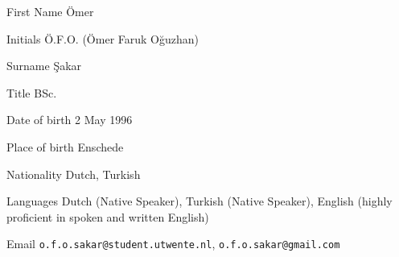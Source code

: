 

\begin{cvskills}


  \cvskill
{First Name} %
{\"Omer} %

  \cvskill
{Initials} %
{\"O.F.O. (\"Omer Faruk O\u{g}uzhan)} %

  \cvskill
{Surname} %
{\c{S}akar} %

  \cvskill
{Title} %
{BSc.} %

  \cvskill
{Date of birth} %
{2 May 1996} %

  \cvskill
{Place of birth} %
{Enschede} %

  \cvskill
{Nationality} %
{Dutch, Turkish} %

  \cvskill
{Languages} %
{Dutch (Native Speaker), Turkish (Native Speaker), English (highly proficient in spoken and written English)} %

  \cvskill
{Email} %
{\texttt{o.f.o.sakar@student.utwente.nl}, \texttt{o.f.o.sakar@gmail.com}} %


\end{cvskills}